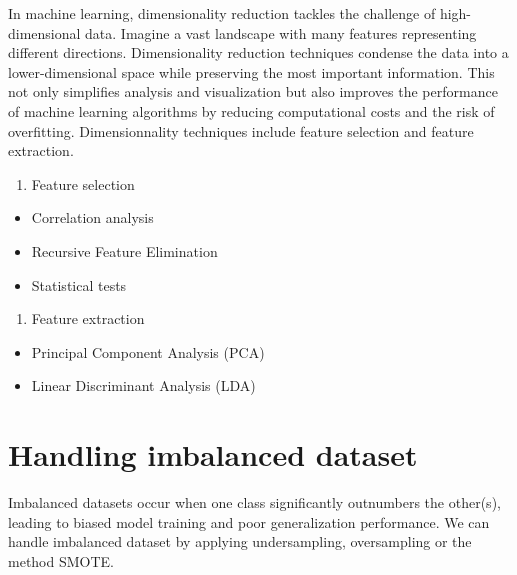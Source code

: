 \documentclass[
]{book}
\providecommand{\tightlist}{%
  \setlength{\itemsep}{0pt}\setlength{\parskip}{0pt}}
\begin{document}
In machine learning, dimensionality reduction tackles the challenge of high-dimensional data. Imagine a vast landscape with many features representing different directions. Dimensionality reduction techniques condense the data into a lower-dimensional space while preserving the most important information. This not only simplifies analysis and visualization but also improves the performance of machine learning algorithms by reducing computational costs and the risk of overfitting. Dimensionnality techniques include feature selection and feature extraction.

\begin{enumerate}
\def\labelenumi{\arabic{enumi}.}
\tightlist
\item
  Feature selection
\end{enumerate}

\begin{itemize}
\tightlist
\item
  Correlation analysis
\item
  Recursive Feature Elimination
\item
  Statistical tests
\end{itemize}

\begin{enumerate}
\def\labelenumi{\arabic{enumi}.}
\setcounter{enumi}{1}
\tightlist
\item
  Feature extraction
\end{enumerate}

\begin{itemize}
\tightlist
\item
  Principal Component Analysis (PCA)
\item
  Linear Discriminant Analysis (LDA)
\end{itemize}

\hypertarget{handling-imbalanced-dataset}{%
\section{Handling imbalanced dataset}\label{handling-imbalanced-dataset}}

Imbalanced datasets occur when one class significantly outnumbers the other(s), leading to biased model training and poor generalization performance.
We can handle imbalanced dataset by applying undersampling, oversampling or the method SMOTE.
\end{document}

